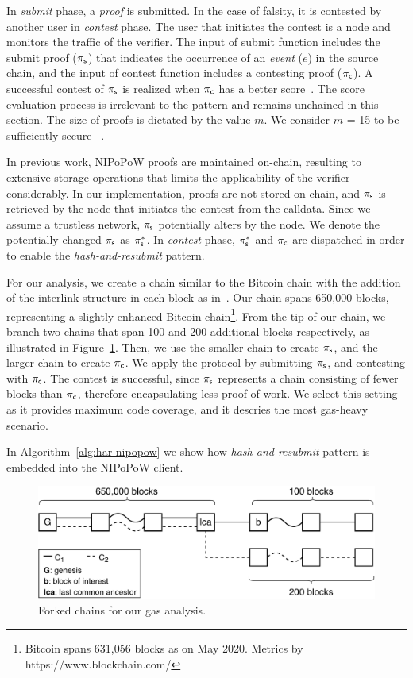 In \emph{submit} phase, a \emph{proof} is submitted. In the case of falsity, it
is contested by another user in \emph{contest} phase. The user that initiates
the contest is a node and monitors the traffic of the verifier. The input of
\textsf{submit} function includes the submit proof ($\mathsf{\pi_{s}}$) that indicates the
occurrence of an \emph{event} ($e$) in the source chain, and the input of
\textsf{contest} function includes a contesting proof ($\mathsf{\pi_{c}}$). A successful
contest of $\mathsf{\pi_{s}}$ is realized when $\mathsf{\pi_{c}}$ has a better score~\cite{nipopows}.
The score evaluation process is irrelevant to the pattern and remains unchained
in this section. The size of proofs is dictated by the value $m$. We consider
$m$ = 15 to be sufficiently secure ~\cite{nipopows}.

In previous work, NIPoPoW proofs are maintained on-chain, resulting to
extensive storage operations that limits the applicability of the verifier
considerably. In our implementation, proofs are not stored on-chain, and $\mathsf{\pi_{s}}$
is retrieved by the node that initiates the contest from the calldata. Since we
assume a trustless network, $\mathsf{\pi_{s}}$ potentially alters by the node. We denote
the potentially changed $\mathsf{\pi_{s}}$ as $\mathsf{\pi_{s}^*}$. In \emph{contest} phase, $\mathsf{\pi_{s}^*}$ and
$\mathsf{\pi_{c}}$ are dispatched in order to enable the \emph{hash-and-resubmit} pattern.

For our analysis, we create a chain similar to the Bitcoin chain with the
addition of the interlink structure in each block as in~\cite{gglou}. Our chain
spans 650,000 blocks, representing a slightly enhanced Bitcoin
chain\footnote{Bitcoin spans 631,056 blocks as on May 2020. Metrics by
https://www.blockchain.com/}. From the tip of our chain, we branch two chains
that span 100 and 200 additional blocks respectively, as illustrated in
Figure~\ref{fig:chains}. Then, we use the smaller chain to create $\mathsf{\pi_{s}}$, and
the larger chain to create $\mathsf{\pi_{c}}$. We apply the protocol by submitting $\mathsf{\pi_{s}}$,
and contesting with $\mathsf{\pi_{c}}$. The contest is successful, since $\mathsf{\pi_{s}}$ represents
a chain consisting of fewer blocks than $\mathsf{\pi_{c}}$, therefore encapsulating less
proof of work. We select this setting as it provides maximum code coverage, and
it descries the most gas-heavy scenario.

In Algorithm~\ref{alg:har-nipopow} we show how \emph{hash-and-resubmit} pattern
is embedded into the NIPoPoW client.

\begin{figure}[!h]
    \begin{center}
        \includegraphics[width=1\columnwidth]{figures/nipopow-subm-cont}
    \end{center}
    \caption{Forked chains for our gas analysis.}
    \label{fig:chains}
\end{figure}

